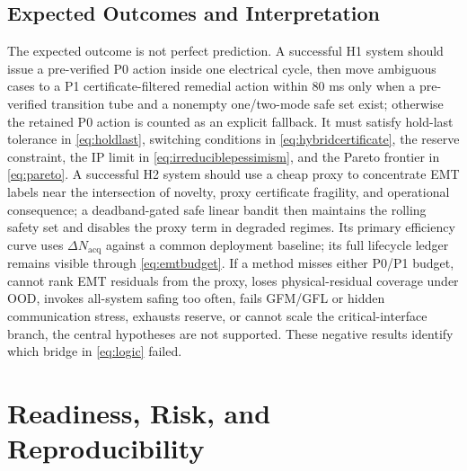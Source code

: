 \documentclass[conference]{IEEEtran}
\begin{document}
\subsection{Expected Outcomes and Interpretation}

The expected outcome is not perfect prediction. A successful H1 system should issue a pre-verified P0 action inside one electrical cycle, then move ambiguous cases to a P1 certificate-filtered remedial action within 80 ms only when a pre-verified transition tube and a nonempty one/two-mode safe set exist; otherwise the retained P0 action is counted as an explicit fallback. It must satisfy hold-last tolerance in \eqref{eq:holdlast}, switching conditions in \eqref{eq:hybridcertificate}, the reserve constraint, the IP limit in \eqref{eq:irreduciblepessimism}, and the Pareto frontier in \eqref{eq:pareto}. A successful H2 system should use a cheap proxy to concentrate EMT labels near the intersection of novelty, proxy certificate fragility, and operational consequence; a deadband-gated safe linear bandit then maintains the rolling safety set and disables the proxy term in degraded regimes. Its primary efficiency curve uses $\Delta N_{\mathrm{acq}}$ against a common deployment baseline; its full lifecycle ledger remains visible through \eqref{eq:emtbudget}. If a method misses either P0/P1 budget, cannot rank EMT residuals from the proxy, loses physical-residual coverage under OOD, invokes all-system safing too often, fails GFM/GFL or hidden communication stress, exhausts reserve, or cannot scale the critical-interface branch, the central hypotheses are not supported. These negative results identify which bridge in \eqref{eq:logic} failed.

\section{Readiness, Risk, and Reproducibility}
\end{document}
